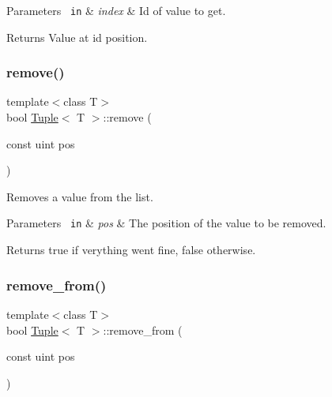 \begin{DoxyParams}[1]{Parameters}
\mbox{\texttt{ in}}  & {\em index} & Id of value to get. \\
\hline
\end{DoxyParams}
\begin{DoxyReturn}{Returns}
Value at id position. 
\end{DoxyReturn}
\mbox{\label{class_tuple_ad7436ece54558c2940f79c539f83f611}} 
\subsubsection{\texorpdfstring{remove()}{remove()}}
{\footnotesize\ttfamily template$<$class T$>$ \\
bool \mbox{\hyperlink{class_tuple}{Tuple}}$<$ T $>$\+::remove (\begin{DoxyParamCaption}\item[{const uint}]{pos }\end{DoxyParamCaption})\hspace{0.3cm}{\ttfamily [inline]}}



Removes a value from the list. 


\begin{DoxyParams}[1]{Parameters}
\mbox{\texttt{ in}}  & {\em pos} & The position of the value to be removed. \\
\hline
\end{DoxyParams}
\begin{DoxyReturn}{Returns}
{\ttfamily true} if verything went fine, {\ttfamily false} otherwise. 
\end{DoxyReturn}
\mbox{\label{class_tuple_a60370cde243871dfafb0ac96404c6f90}} 
\subsubsection{\texorpdfstring{remove\_from()}{remove\_from()}}
{\footnotesize\ttfamily template$<$class T$>$ \\
bool \mbox{\hyperlink{class_tuple}{Tuple}}$<$ T $>$\+::remove\+\_\+from (\begin{DoxyParamCaption}\item[{const uint}]{pos }\end{DoxyParamCaption})\hspace{0.3cm}{\ttfamily [inline]}}


